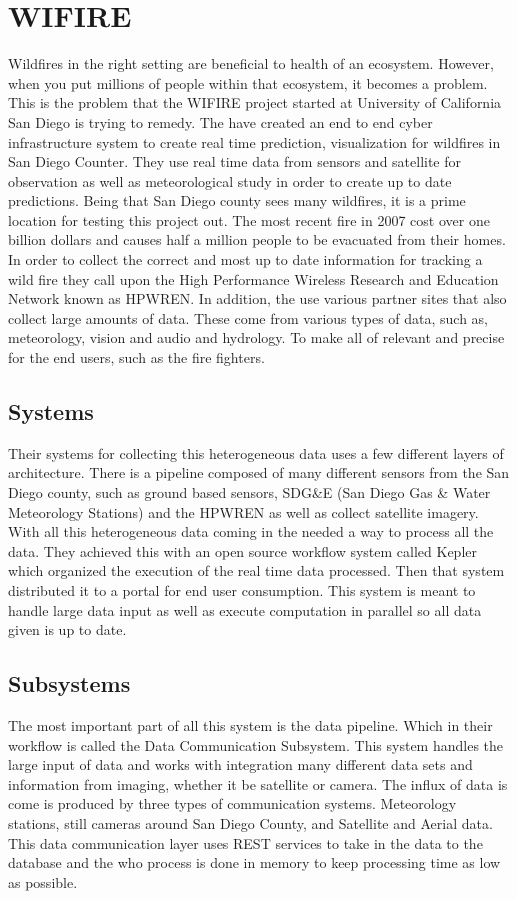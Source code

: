 \documentclass[sigconf]{acmart}
\begin{document}
\section{WIFIRE}
Wildfires in the right setting are beneficial to health of an ecosystem.  However, when you put millions of people within that ecosystem, it becomes a problem.  This is the problem that the WIFIRE project started at University of California San Diego is trying to remedy.   The have created an end to end cyber infrastructure system to create real time prediction, visualization for wildfires in San Diego Counter. They use real time data from sensors and satellite for observation as well as meteorological study in order to create up to date predictions.  Being that San Diego county sees many wildfires, it is a prime location for testing this project out.  The most recent fire in 2007 cost over one billion dollars and causes half a million people to be evacuated from their homes.\cite{NPR} In order to collect the correct and most up to date information for tracking a wild fire they call upon the High Performance Wireless Research and Education Network known as HPWREN.  In addition, the use various partner sites that also collect large amounts of data.  These come from various types of data, such as, meteorology, vision and audio and hydrology.   To make all of relevant and precise for the end users, such as the fire fighters.

\subsection{Systems}
Their systems for collecting this heterogeneous data uses a few different layers of architecture. There is a pipeline composed of many different sensors from the San Diego county, such as ground based sensors, SDG\&E (San Diego Gas \& Water Meteorology Stations) and the HPWREN as well as collect satellite imagery.  With all this heterogeneous data coming in the needed a way to process all the data.  They achieved this with  an open source workflow system called Kepler which organized the execution of the real time data processed.  Then that system distributed it to a portal for end user consumption.  This system is meant to handle large data input as well as execute computation in parallel so all data given is up to date.\cite{ALTINTAS}

\subsection{Subsystems}
The most important part of all this system is the data pipeline.  Which in their workflow is called the Data Communication Subsystem.  This system handles the large input of data and works with integration many different data sets and information from imaging, whether it be satellite or camera.  The influx of data is come is produced by three types of communication systems.  Meteorology stations, still cameras around San Diego County, and Satellite and Aerial data.  This data communication layer uses REST services to take in the data to the database and the who process is done in memory to keep processing time as low as possible.
\end{document}

